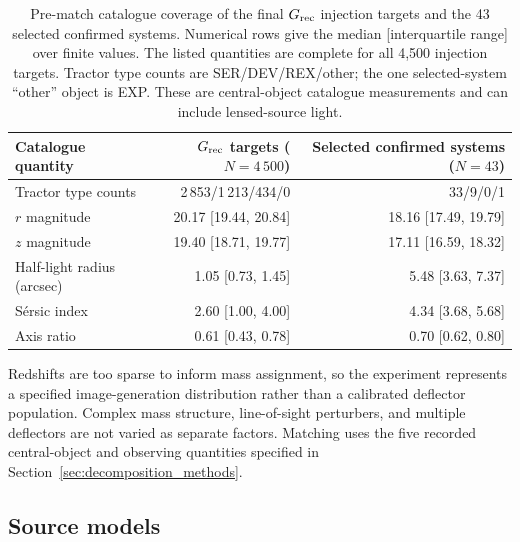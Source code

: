 \begin{table}
\caption{Pre-match catalogue coverage of the final \(G_{\rm rec}\) injection
targets and the 43 selected confirmed systems. Numerical rows give the median
[interquartile range] over finite values. The listed quantities are complete
for all 4,500 injection targets. Tractor type counts are SER/DEV/REX/other;
the one selected-system ``other'' object is EXP. These are central-object
catalogue measurements and can include lensed-source light.}
\label{tab:prematch_coverage}
\centering
\begin{tabular}{lrr}
\toprule
Catalogue quantity & \(G_{\rm rec}\) targets (\(N=4\,500\)) &
Selected confirmed systems (\(N=43\)) \\
\midrule
Tractor type counts & 2\,853/1\,213/434/0 & 33/9/0/1 \\
\(r\) magnitude & 20.17 [19.44, 20.84] & 18.16 [17.49, 19.79] \\
\(z\) magnitude & 19.40 [18.71, 19.77] & 17.11 [16.59, 18.32] \\
Half-light radius (arcsec) & 1.05 [0.73, 1.45] & 5.48 [3.63, 7.37] \\
S\'{e}rsic index & 2.60 [1.00, 4.00] & 4.34 [3.68, 5.68] \\
Axis ratio & 0.61 [0.43, 0.78] & 0.70 [0.62, 0.80] \\
\bottomrule
\end{tabular}
\end{table}

Redshifts are too sparse to inform mass assignment, so the experiment
represents a specified image-generation distribution rather than a calibrated
deflector population. Complex mass structure, line-of-sight perturbers, and
multiple deflectors are not varied as separate factors. Matching uses the five
recorded central-object and observing quantities specified in
Section~\ref{sec:decomposition_methods}.

\subsection{Source models}
\label{sec:source_models}

